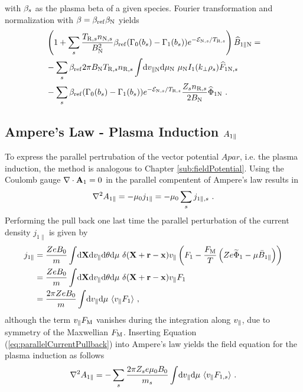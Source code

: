 with $\beta_s$ as the plasma beta of a given species. Fourier transformation and normalization with $\beta = \beta_\mathrm{ref} \beta_\mathrm{N}$ yields
\begin{gather}
    \begin{aligned}
        &\left(1 + \sum_s \frac{T_{\mathrm{R},s}n_{\mathrm{N},s}}{B_\mathrm{N}^2} \beta_\mathrm{ref} (\Gamma_0(b_s) - \Gamma_1(b_s)) e^{-\mathcal{E}_{\mathrm{N},s}/T_{\mathrm{R},s}}\right) \widehat{B}_{1\parallel \mathrm{N}} = \\
        &-\sum_s \beta_\mathrm{ref} 2\pi B_\mathrm{N} T_{\mathrm{R},s} n_{\mathrm{R},s} \int \! \mathrm{d}v_{\parallel \mathrm{N}} \mathrm{d}\mu_\mathrm{N} ~ \mu_\mathrm{N} I_1(k_\perp \rho_s) \widehat{F}_{1\mathrm{N},s} \\
        &-\sum_s \beta_\mathrm{ref} (\Gamma_0(b_s) - \Gamma_1(b_s)) e^{-\mathcal{E}_{\mathrm{N},s}/T_{\mathrm{R},s}} \frac{Z_sn_{\mathrm{R},s}}{2 B_\mathrm{N}} \widehat{\Phi}_{1 \mathrm{N}} ~.
    \end{aligned}
\end{gather}
\newpage

\subsection{Ampere's Law - Plasma Induction $A_{1\parallel}$}
\label{sub:fieldInduction}

To express the parallel pertrubation of the vector potential $Apar$, i.e. the plasma induction, the method is analogous to Chapter \ref{sub:fieldPotential}. Using the Coulomb gauge $\nabla \cdot \boldsymbol{\mathbf{A}}_1 = 0$ in the parallel compentent of Ampere's law results in
\begin{gather}
	\nabla^2 A_{1\parallel} = - \mu_0 j_{1\parallel} = - \mu_0 \sum_s j_{1\parallel,s}~.
	\label{eq:parallelAmpereLaw}
\end{gather}
Performing the pull back one last time the parallel perturbation of the current density $j_{1\parallel}$ is given by
\begin{gather}
	\begin{aligned}
		j_{1\parallel} &= \frac{Ze B_0}{m} \int \! \mathrm{d}\boldsymbol{\mathbf{X}}\mathrm{d}v_\parallel\mathrm{d}\theta\mathrm{d}\mu ~ \delta(\boldsymbol{\mathbf{X}} + \boldsymbol{\mathbf{r}} - \boldsymbol{\mathbf{x}}) v_\parallel \left(F_1 - \frac{F_\mathrm{M}}{T}\left(Ze \widetilde{\Phi}_1 - \mu \bar{B}_{1\parallel}\right) \right)\\
					   &= \frac{Ze B_0}{m} \int \! \mathrm{d}\boldsymbol{\mathbf{X}}\mathrm{d}v_\parallel\mathrm{d}\theta\mathrm{d}\mu ~ \delta(\boldsymbol{\mathbf{X}} + \boldsymbol{\mathbf{r}} - \boldsymbol{\mathbf{x}}) v_\parallel F_1 \\
					   &= \frac{2\pi Ze B_0}{m} \int \! \mathrm{d}v_\parallel\mathrm{d}\mu ~ \langle v_\parallel F_1\rangle~,
	\end{aligned}
	\label{eq:parallelCurrentPullback}
\end{gather}
although the term $v_\parallel F_\mathrm{M}$ vanishes during the integration along $v_\parallel$, due to symmetry of the Maxwellian $F_\mathrm{M}$. 
Inserting Equation (\ref{eq:parallelCurrentPullback}) into Ampere's law yields the field equation for the plasma induction as follows
\begin{gather}
	\nabla^2 A_{1\parallel} = - \sum_s \frac{2\pi Z_se \mu_0 B_0}{m_s}  \int \! \mathrm{d}v_\parallel\mathrm{d}\mu ~ \langle v_\parallel F_{1,s}\rangle~.
	\label{eq:fieldInduction}
\end{gather}

